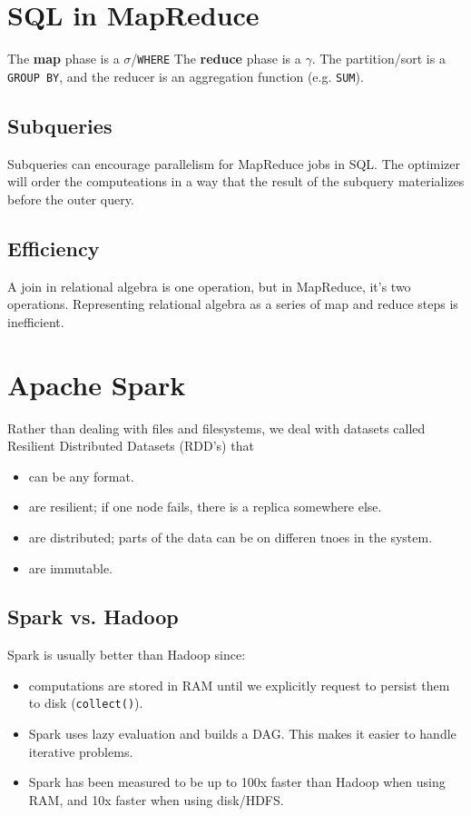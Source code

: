 \documentclass{report}
\renewcommand{\bf}[1]{\textbf{{#1}}}
\renewcommand{\tt}[1]{\texttt{{#1}}}
\begin{document}
\section{SQL in MapReduce}
The \bf{map} phase is a $\sigma$/\tt{WHERE} The \bf{reduce} phase is a $\gamma$.
The partition/sort is a \tt{GROUP BY}, and the reducer is an aggregation
function (e.g. \tt{SUM}).

\subsection{Subqueries}
Subqueries can encourage parallelism for MapReduce jobs in SQL. The optimizer
will order the computeations in a way that the result of the subquery
materializes before the outer query.

\subsection{Efficiency}
A join in relational algebra is one operation, but in MapReduce, it's two
operations. Representing relational algebra as a series of map and reduce steps
is inefficient.

\section{Apache Spark}
Rather than dealing with files and filesystems, we deal with datasets called
Resilient Distributed Datasets (RDD's) that
\begin{itemize}[label=$\to$]
    \item can be any format.
    \item are resilient; if one node fails, there is a replica somewhere else.
    \item are distributed; parts of the data can be on differen tnoes in the
        system.
    \item are immutable.
\end{itemize}

\subsection{Spark vs. Hadoop}
Spark is usually better than Hadoop since:
\begin{itemize}[label=$\to$]
    \item computations are stored in RAM until we explicitly request to persist
        them to disk (\tt{collect()}).
    \item Spark uses lazy evaluation and builds a DAG. This makes it easier to
        handle iterative problems.
    \item Spark has been measured to be up to 100x faster than Hadoop when using
        RAM, and 10x faster when using disk/HDFS.
\end{itemize}
\end{document}
